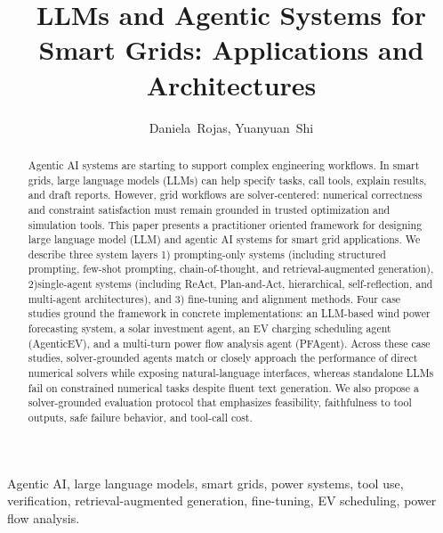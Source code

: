 \documentclass[journal,onecolumn]{IEEEtran} %
\title{LLMs and Agentic Systems for Smart Grids: Applications and Architectures}
\author{
Daniela~Rojas, Yuanyuan~Shi
}
\begin{document}
\maketitle

\begin{abstract}
Agentic AI systems are starting to support complex engineering workflows. In smart grids, large language models (LLMs) can help specify tasks, call tools, explain results, and draft reports. However, grid workflows are solver-centered: numerical correctness and constraint satisfaction must remain grounded in trusted optimization and simulation tools.
This paper presents a practitioner oriented framework for designing large language model (LLM) and agentic AI systems for smart grid applications. We describe three system layers 1) prompting-only systems (including structured prompting, few-shot prompting, chain-of-thought, and retrieval-augmented generation), 2)single-agent systems (including ReAct, Plan-and-Act, hierarchical, self-reflection, and multi-agent architectures), and 3) fine-tuning and alignment methods.  Four case studies ground the framework in concrete implementations: an LLM-based wind power forecasting system, a solar investment agent, an EV charging scheduling agent (AgenticEV), and a multi-turn power flow analysis agent (PFAgent). Across these case studies, solver-grounded agents match or closely approach the performance of direct numerical solvers while exposing natural-language interfaces, whereas standalone LLMs fail on constrained numerical tasks despite fluent text generation. We also propose a solver-grounded evaluation protocol that emphasizes feasibility, faithfulness to tool outputs, safe failure behavior, and tool-call cost.
\end{abstract}

\begin{IEEEkeywords}
Agentic AI, large language models, smart grids, power systems, tool use, verification, retrieval-augmented generation, fine-tuning, EV scheduling, power flow analysis.
\end{IEEEkeywords}

\end{document}

